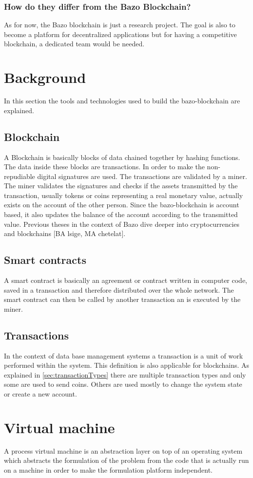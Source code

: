 \subsubsection{How do they differ from the Bazo Blockchain?}
As for now, the Bazo blockchain is just a research project. The goal is also to become a platform for decentralized applications but for having a competitive blockchain, a dedicated team would be needed. 

\section{Background}
In this section the tools and technologies used to build the bazo-blockchain are explained.

\subsection{Blockchain}
A Blockchain is basically blocks of data chained together by hashing functions. The data inside these blocks are transactions. In order to make the non-repudiable digital signatures are used. The transactions are validated by a miner. The miner validates the signatures and checks if the assets transmitted by the transaction, usually tokens or coins representing a real monetary value, actually exists on the account of the other person. Since the bazo-blockchain is account based, it also updates the balance of the account according to the transmitted value. Previous theses in the context of Bazo dive deeper into cryptocurrencies and blockchains [BA lsige, MA chetelat].

\subsection{Smart contracts}
A smart contract is basically an agreement or contract written in computer code, saved in a transaction and therefore distributed over the whole network. The smart contract can then be called by another transaction an is executed by the miner. 

\subsection{Transactions}
In the context of data base management systems a transaction is a unit of work performed within the system. \cite{dbtransaction} This definition is also applicable for blockchains. As explained in \autoref{sec:transactionTypes}
there are multiple transaction types and only some are used to send coins. Others are used mostly to change the system state or create a new account.

\section{Virtual machine}
A process virtual machine is an abstraction layer on top of an operating system which abstracts the formulation of the problem from the code that is actually run on a machine in order to make the formulation platform independent.

